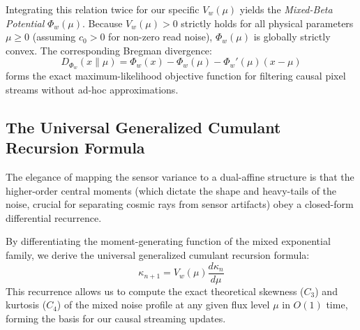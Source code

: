 Integrating this relation twice for our specific $V_w(\mu)$ yields the \textit{Mixed-Beta Potential} $\Phi_w(\mu)$. Because $V_w(\mu) > 0$ strictly holds for all physical parameters $\mu \ge 0$ (assuming $c_0 > 0$ for non-zero read noise), $\Phi_w(\mu)$ is globally strictly convex. The corresponding Bregman divergence:
\begin{equation}
    D_{\Phi_w}(x \parallel \mu) = \Phi_w(x) - \Phi_w(\mu) - \Phi_w'(\mu)(x - \mu)
\end{equation}
forms the exact maximum-likelihood objective function for filtering causal pixel streams without ad-hoc approximations.

\subsection{The Universal Generalized Cumulant Recursion Formula}
The elegance of mapping the sensor variance to a dual-affine structure is that the higher-order central moments (which dictate the shape and heavy-tails of the noise, crucial for separating cosmic rays from sensor artifacts) obey a closed-form differential recurrence. 

By differentiating the moment-generating function of the mixed exponential family, we derive the universal generalized cumulant recursion formula:
\begin{equation}
    \kappa_{n+1} = V_w(\mu) \frac{d\kappa_n}{d\mu}
\end{equation}
This recurrence allows us to compute the exact theoretical skewness ($C_3$) and kurtosis ($C_4$) of the mixed noise profile at any given flux level $\mu$ in $O(1)$ time, forming the basis for our causal streaming updates.
